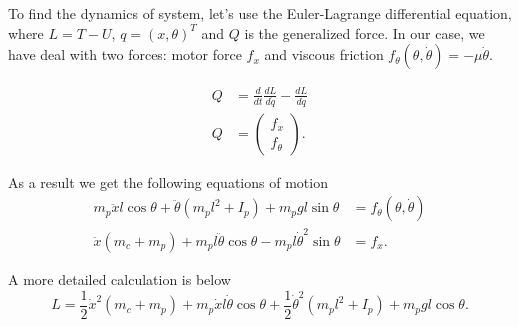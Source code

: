 \documentclass[12pt]{article}
\newcommand{\pmat}[1]{\begin{pmatrix}#1\end{pmatrix}}
\begin{document}
To find the dynamics of system, let's use the Euler-Lagrange differential equation, where $L = T - U$, $q = (x, \theta)^T$ and $Q$ is the generalized force.
In our case, we have deal with two forces: motor force $f_x$ and viscous friction $f_{\theta}(\theta, \dot{\theta}) = -\mu \dot{\theta}$.

\begin{align*}
    Q &= \frac{d}{dt} \frac{dL}{d\dot{q}} - \frac{dL}{dq} \\ 
    Q &= \pmat{f_x \\ f_{\theta}}.
\end{align*}

As a result we get the following equations of motion
\begin{align}
    m_p \ddot{x} l \cos \theta + \ddot{\theta} \left(m_p l^2 + I_p\right) + m_p g l \sin \theta &= f_{\theta}(\theta, \dot{\theta}) \nonumber \\
    \ddot{x}(m_c + m_p) + m_p l \ddot{\theta} \cos \theta - m_p l \dot{\theta}^2 \sin \theta &= f_{x}.
\end{align}

A more detailed calculation is below
\begin{equation}
    L = \frac{1}{2} \dot{x}^2 (m_c + m_p) + m_p \dot{x} l \dot{\theta} \cos \theta + \frac{1}{2} \dot{\theta}^2 \left( m_p l^2  + I_p \right) + m_p gl \cos \theta.
\end{equation}
\end{document}
